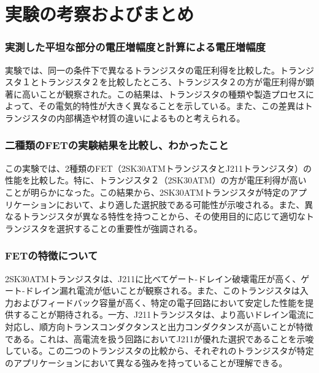 \documentclass[a4paper,11pt,xelatex,ja=standard]{bxjsarticle}
\begin{document}
    \section{実験の考察およびまとめ}

        \subsubsection{実測した平坦な部分の電圧増幅度と計算による電圧増幅度}
            実験では、同一の条件下で異なるトランジスタの電圧利得を比較した。トランジスタ１とトランジスタ２を比較したところ、トランジスタ２の方が電圧利得が顕著に高いことが観察された。この結果は、トランジスタの種類や製造プロセスによって、その電気的特性が大きく異なることを示している。また、この差異はトランジスタの内部構造や材質の違いによるものと考えられる。
    
        \subsubsection{二種類のFETの実験結果を比較し、わかったこと}
            この実験では、2種類のFET（2SK30ATMトランジスタとJ211トランジスタ）の性能を比較した。特に、トランジスタ２（2SK30ATM）の方が電圧利得が高いことが明らかになった。この結果から、2SK30ATMトランジスタが特定のアプリケーションにおいて、より適した選択肢である可能性が示唆される。また、異なるトランジスタが異なる特性を持つことから、その使用目的に応じて適切なトランジスタを選択することの重要性が強調される。
    
        \subsubsection{FETの特徴について}
            2SK30ATMトランジスタは、J211に比べてゲート-ドレイン破壊電圧が高く、ゲート-ドレイン漏れ電流が低いことが観察される。また、このトランジスタは入力およびフィードバック容量が高く、特定の電子回路において安定した性能を提供することが期待される。一方、J211トランジスタは、より高いドレイン電流に対応し、順方向トランスコンダクタンスと出力コンダクタンスが高いことが特徴である。これは、高電流を扱う回路においてJ211が優れた選択であることを示唆している。この二つのトランジスタの比較から、それぞれのトランジスタが特定のアプリケーションにおいて異なる強みを持っていることが理解できる。
    
\end{document}
